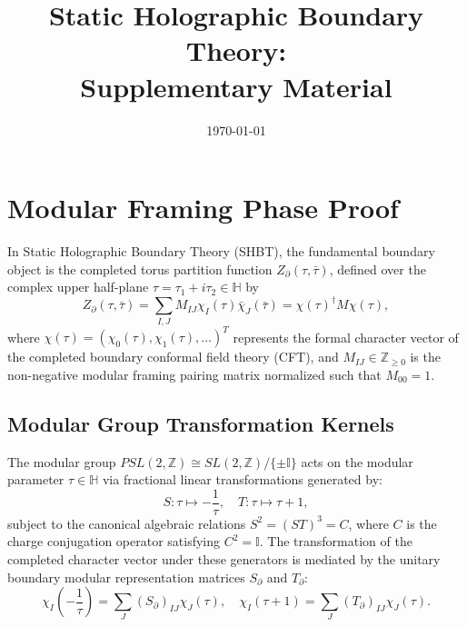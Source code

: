 \documentclass[11pt]{article}
\title{Static Holographic Boundary Theory:\\
Supplementary Material}
\author{}
\date{\today}
\theoremstyle{plain}
\begin{document}
\maketitle

\section{Modular Framing Phase Proof}
\label{sec:modular_framing_proof}
\label{app:center-directed-modular-framing}

In Static Holographic Boundary Theory (SHBT), the fundamental boundary object is the completed torus partition function $Z_{\partial}(\tau, \bar{\tau})$, defined over the complex upper half-plane $\tau = \tau_1 + i \tau_2 \in \mathbb{H}$ by
\begin{equation}
Z_{\partial}(\tau, \bar{\tau}) = \sum_{I, J} M_{IJ} \chi_I(\tau) \bar{\chi}_J(\bar{\tau}) = \chi(\tau)^\dagger M \chi(\tau),
\end{equation}
where $\chi(\tau) = (\chi_0(\tau), \chi_1(\tau), \dots)^T$ represents the formal character vector of the completed boundary conformal field theory (CFT), and $M_{IJ} \in \mathbb{Z}_{\ge 0}$ is the non-negative modular framing pairing matrix normalized such that $M_{00} = 1$.

\subsection{Modular Group Transformation Kernels}
The modular group $PSL(2,\mathbb{Z}) \cong SL(2,\mathbb{Z}) / \{\pm \mathbb{I}\}$ acts on the modular parameter $\tau \in \mathbb{H}$ via fractional linear transformations generated by:
\begin{equation}
S: \tau \mapsto -\frac{1}{\tau}, \quad T: \tau \mapsto \tau + 1,
\end{equation}
subject to the canonical algebraic relations $S^2 = (ST)^3 = C$, where $C$ is the charge conjugation operator satisfying $C^2 = \mathbb{I}$. The transformation of the completed character vector under these generators is mediated by the unitary boundary modular representation matrices $S_{\partial}$ and $T_{\partial}$:
\begin{equation}
\chi_I\left(-\frac{1}{\tau}\right) = \sum_{J} (S_{\partial})_{IJ} \chi_J(\tau), \quad \chi_I(\tau + 1) = \sum_{J} (T_{\partial})_{IJ} \chi_J(\tau).
\end{equation}
\end{document}
